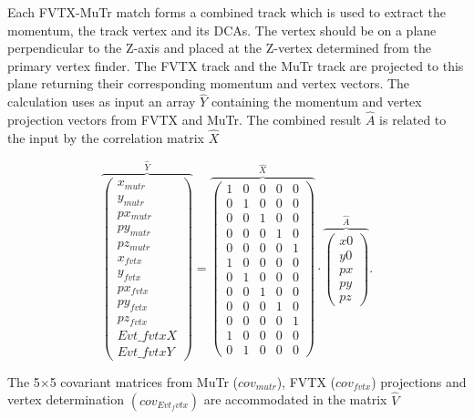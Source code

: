 \documentclass[12pt]{article}
\begin{document}
Each FVTX-MuTr match forms a combined track which is used to extract the momentum, the track vertex and its DCAs. 
The vertex should be on a plane perpendicular to the Z-axis and placed at the Z-vertex determined from the primary vertex finder. 
The FVTX track and the MuTr track are projected to this plane returning their corresponding momentum and vertex vectors.
The calculation uses as input an array $\hat{Y}$ containing the momentum and vertex projection vectors from FVTX and MuTr. 
The combined result $\hat{A}$ is related to the input by the correlation matrix $\hat{X}$ 

\begin{equation}
\overbrace{\left(\begin{array}{c}x_{mutr}\\y_{mutr}\\px_{mutr}\\py_{mutr}\\pz_{mutr}\\x_{fvtx}\\y_{fvtx}\\px_{fvtx}\\py_{fvtx}\\pz_{fvtx}\\ Evt\_fvtxX\\ Evt\_fvtxY\end{array}\right)}^{\hat{Y}} 
= \overbrace{\left(\begin{array}{ccccc}1&0&0&0&0\\ 0&1&0&0&0\\ 0&0&1&0&0\\ 0&0&0&1&0\\ 0&0&0&0&1\\1&0&0&0&0\\ 0&1&0&0&0\\ 0&0&1&0&0\\ 0&0&0&1&0\\ 0&0&0&0&1\\1&0&0&0&0\\0&1&0&0&0  \end{array}\right)}^{\hat{X}}
\cdot \overbrace{\left(\begin{array}{c} x0\\ y0 \\ px \\ py \\ pz \end{array} \right)}^{\hat{A}}.
\end{equation}

The 5$\times$5 covariant matrices from MuTr ($cov_{mutr}$), FVTX ($cov_{fvtx}$) projections and vertex determination $(cov_{Evt_fvtx})$ are accommodated in the matrix $\hat{V}$
\end{document}
